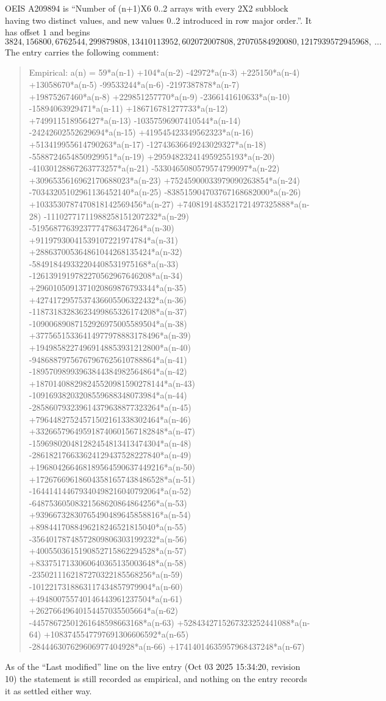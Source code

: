 \documentclass[11pt,a4paper]{article}
\theoremstyle{plain}
\theoremstyle{definition}
\begin{document}
OEIS A209894 is ``Number of (n+1)X6 0..2 arrays with every 2X2 subblock having two distinct values, and new values 0..2 introduced in row major order.''. It has offset $1$ and begins
\[
3824, 156800, 6762544, 299879808, 13410113952, 602072007808, 27070584920080, 1217939572945968,\ \dots
\]
The entry carries the following comment:
\begin{quote}\small
Empirical: a(n) = 59*a(n-1) +104*a(n-2) -42972*a(n-3) +225150*a(n-4) +13058670*a(n-5) -99533244*a(n-6) -2197387878*a(n-7) +19875267460*a(n-8) +229851257770*a(n-9) -2366141610633*a(n-10) -15894063929471*a(n-11) +186716781277733*a(n-12) +749911518956427*a(n-13) -10357596907410544*a(n-14) -24242602552629694*a(n-15) +419545423349562323*a(n-16) +513419955614790263*a(n-17) -12743636649243029327*a(n-18) -5588724654850929951*a(n-19) +295948232414959255193*a(n-20) -41030128867263773257*a(n-21) -5330465080579574799097*a(n-22) +3096535616962170688023*a(n-23) +75245900033979090263854*a(n-24) -70343205102961136452140*a(n-25) -838515904703767168682000*a(n-26) +1033530787470818142569456*a(n-27) +7408191483521721497325888*a(n-28) -11102771711988258151207232*a(n-29) -51956877639237774786347264*a(n-30) +91197930041539107221974784*a(n-31) +288637005364861044268135424*a(n-32) -584918449332204408531975168*a(n-33) -1261391919782270562967646208*a(n-34) +2960105091371020869876793344*a(n-35) +4274172957537436605506322432*a(n-36) -11873183283623499865326174208*a(n-37) -10900689087152926975005589504*a(n-38) +37756515336414977978883178496*a(n-39) +19498582274969148853931212800*a(n-40) -94868879756767967625610788864*a(n-41) -18957098993963844384982564864*a(n-42) +187014088298245520981590278144*a(n-43) -10916938203208559688348073984*a(n-44) -285860793239614379638877323264*a(n-45) +79644827524571502161338302464*a(n-46) +332665796495918740601567182848*a(n-47) -159698020481282454813413474304*a(n-48) -286182176633624129437528227840*a(n-49) +196804266468189564590637449216*a(n-50) +172676696186043581657438486528*a(n-51) -164414144679340498216040792064*a(n-52) -64875360508321568620864864256*a(n-53) +93966732830765490489645858816*a(n-54) +8984417088496218246521815040*a(n-55) -35640178748572809806303199232*a(n-56) +4005503615190852715862294528*a(n-57) +8337517133060640365135003648*a(n-58) -2350211162187270322185568256*a(n-59) -1012217318863117434857979904*a(n-60) +494800755740146443961237504*a(n-61) +26276649640154457035505664*a(n-62) -44578672501261648598663168*a(n-63) +5284342715267323252441088*a(n-64) +1083745547797691306606592*a(n-65) -284446307629606977404928*a(n-66) +17414014635957968437248*a(n-67)
\end{quote}
As of the ``Last modified'' line on the live entry (Oct 03 2025 15:34:20, revision 10) the statement is
still recorded as empirical, and nothing on the entry records it as settled either way.
\end{document}
